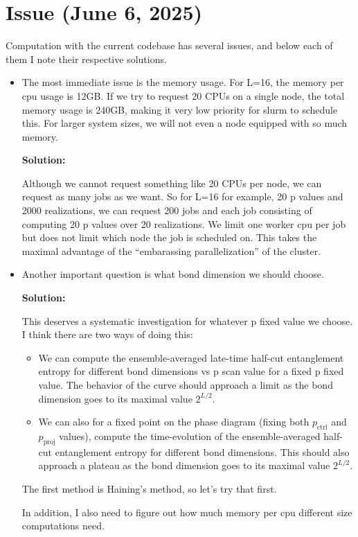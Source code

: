 \documentclass[11pt,a4paper]{article}
\begin{document}
\section{Issue (June 6, 2025)}

Computation with the current codebase has several issues, and below each of them I note their respective solutions.

\begin{itemize}
    \item The most immediate issue is the memory usage. For L=16, the memory per cpu usage is 12GB. If we try to request 20 CPUs on a single node, the total memory usage is 240GB, making it very low priority for slurm to schedule this. For larger system sizes, we will not even a node equipped with so much memory.

    \textbf{Solution:}

    Although we cannot request something like 20 CPUs per node, we can request as many jobs as we want. So for L=16 for example, 20 p values and 2000 realizations, we can request 200 jobs and each job consisting of computing 20 p values over 20 realizations. We limit one worker cpu per job but does not limit which node the job is scheduled on. This takes the maximal advantage of the ``embarassing parallelization'' of the cluster. 

    \item Another important question is what bond dimension we should choose.

    \textbf{Solution:}
    
    This deserves a systematic investigation for whatever p fixed value we choose. I think there are two ways of doing this: 

    \begin{itemize}
        \item We can compute the ensemble-averaged late-time half-cut entanglement entropy for different bond dimensions vs p scan value for a fixed p fixed value. The behavior of the curve should approach a limit as the bond dimension goes to its maximal value $2^{L/2}$. 
        \item We can also for a fixed point on the phase diagram (fixing both $p_\text{ctrl}$ and $p_\text{proj}$ values), compute the time-evolution of the ensemble-averaged half-cut entanglement entropy for different bond dimensions. This should also approach a plateau as the bond dimension goes to its maximal value $2^{L/2}$.
    \end{itemize}

    The first method is Haining's method, so let's try that first.

    \par In addition, I also need to figure out how much memory per cpu different size computations need. 
\end{itemize}
\end{document}
